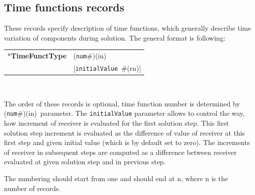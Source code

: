 \documentclass[a4paper]{article}
\makeatletter
\newcommand{\param}[1]{\texttt{#1}} %
\newcommand{\optional}[1]{[#1]} %
\newcommand{\field}[2]{\param{#1}~\#{\tiny(#2)}} %
\newcommand{\optField}[2]{\optional{\field{#1}{#2}}}
\newcommand{\componentNum}{(\param{num}\#){\tiny(in)}} %
\newcommand{\entKeyword}[1]{*\textbf{#1}} %
\newenvironment{record}[1][]{\begin{tabular}{|ll}}{\end{tabular}\\}
\newcommand{\recentry}[2]{{#1}&{#2}\\}
\newcounter{rcc}
\newenvironment{record}[1][\textwidth]{\setcounter{rcc}{0}\begin{tabular*}{#1}{|ll@{\extracolsep{\fill}}r}}{\end{tabular*}\\}
\newcommand{\recentry}[2]{\ifthenelse{\value{rcc}>0}{&$\backslash$ \\}{\setcounter{rcc}{1}}{#1}&{#2}}
\makeatother
\begin{document}
\subsection{Time functions records}
\label{_TimeFunctionsRecords}
These records specify description of time functions, which generally describe
time variation of components during solution. The  general format is
following:

\noindent
\begin{record}
  \recentry{\entKeyword{TimeFunctType}}{\componentNum}
  \recentry{}{\optField{initialValue}{rn}}
\end{record}

The order of these records is optional, time function number is determined by \componentNum\ parameter.
The \param{initialValue} parameter allows to control the way, how increment of receiver is evaluated for the first solution step.
This first solution step increment is evaluated as the difference of value of receiver at this first step and given initial value (which is by default set to zero).
The increments of receiver in subsequent steps are computed as a difference between receiver evaluated at given solution step and in previous step.

The numbering should start from one and should end at n, where n is the number of records.
\end{document}
